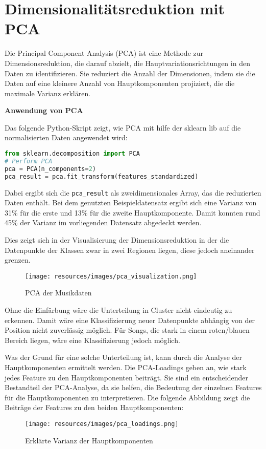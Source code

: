 \section{Dimensionalitätsreduktion mit PCA}

Die Principal Component Analysis (PCA) ist eine Methode zur Dimensionsreduktion, die darauf abzielt, die Hauptvariationsrichtungen in den Daten zu identifizieren. Sie reduziert die Anzahl der Dimensionen, indem sie die Daten auf eine kleinere Anzahl von Hauptkomponenten projiziert, die die maximale Varianz erklären.

\textbf{Anwendung von PCA}

Das folgende Python-Skript zeigt, wie PCA mit hilfe der sklearn lib auf die normalisierten Daten angewendet wird:

\begin{lstlisting}[language=python, caption={PCA-Analyse der Musikdaten}]
from sklearn.decomposition import PCA
# Perform PCA
pca = PCA(n_components=2)
pca_result = pca.fit_transform(features_standardized)
\end{lstlisting}

Dabei ergibt sich die \texttt{pca\_result} als zweidimensionales Array, das die reduzierten Daten enthält. Bei dem genutzten Beispieldatensatz ergibt sich eine Varianz von 31\% für die erste und 13\% für die zweite Hauptkomponente. Damit konnten rund 45\% der Varianz im vorliegenden Datensatz abgedeckt werden.

Dies zeigt sich in der Visualisierung der Dimensionsreduktion in der die Datenpunkte der Klassen zwar in zwei Regionen liegen, diese jedoch aneinander grenzen.
\begin{figure}[H]
    \centering
    \texttt{[image: resources/images/pca\_visualization.png]}
    \caption{PCA der Musikdaten}
\end{figure}

Ohne die Einfärbung wäre die Unterteilung in Cluster nicht eindeutig zu erkennen. Damit wäre eine Klassifizierung neuer Datenpunkte abhängig von der Position nicht zuverlässig möglich. Für Songs, die stark in einem roten/blauen Bereich liegen, wäre eine Klassifizierung jedoch möglich.

Was der Grund für eine solche Unterteilung ist, kann durch die Analyse der Hauptkomponenten ermittelt werden.
Die PCA-Loadings geben an, wie stark jedes Feature zu den Hauptkomponenten beiträgt. Sie sind ein entscheidender Bestandteil der PCA-Analyse, da sie helfen, die Bedeutung der einzelnen Features für die Hauptkomponenten zu interpretieren. Die folgende Abbildung zeigt die Beiträge der Features zu den beiden Hauptkomponenten:
\begin{figure}[H]
    \centering
    \texttt{[image: resources/images/pca\_loadings.png]}
    \caption{Erklärte Varianz der Hauptkomponenten}
\end{figure}

